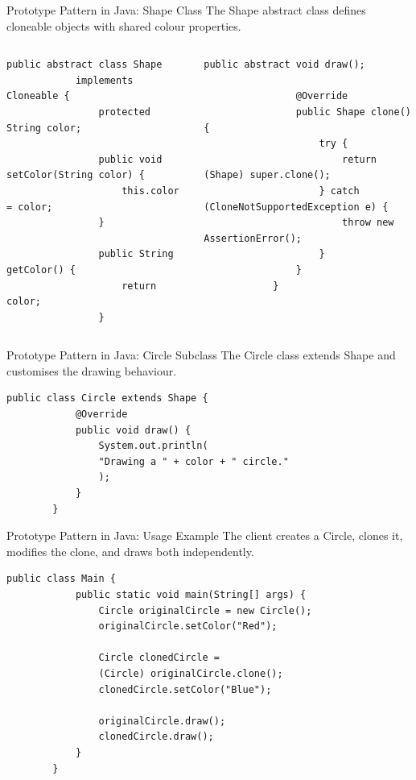 \documentclass[aspectratio=169, table]{beamer}
\begin{document}
\begin{frame}[fragile]{Prototype Pattern in Java: Shape Class}
	\vspace{20pt}
	The Shape abstract class defines cloneable objects with shared colour properties.
	
	\vspace{10pt}
	\begin{columns}[T]
		\begin{lstlisting}[style=JavaStyle]
			public abstract class Shape 
			implements Cloneable {
				protected String color;
				
				public void setColor(String color) {
					this.color = color;
				}
				
				public String getColor() {
					return color;
				}
			\end{lstlisting}
			
			\begin{lstlisting}[style=JavaStyle, firstnumber=12]
				public abstract void draw();
				
				@Override
				public Shape clone() {
					try {
						return (Shape) super.clone();
					} catch (CloneNotSupportedException e) {
						throw new AssertionError();
					}
				}
			}
		\end{lstlisting}
	\end{columns}
\end{frame}



\begin{frame}[fragile]{Prototype Pattern in Java: Circle Subclass}
	\vspace{20pt}
	The Circle class extends Shape and customises the drawing behaviour.
	
	\vspace{10pt}
	\begin{lstlisting}[style=JavaStyle]
		public class Circle extends Shape {
			@Override
			public void draw() {
				System.out.println(
				"Drawing a " + color + " circle."
				);
			}
		}
	\end{lstlisting}
\end{frame}

\begin{frame}[fragile]{Prototype Pattern in Java: Usage Example}
	\vspace{20pt}
	The client creates a Circle, clones it, modifies the clone, and draws both independently.
	
	\vspace{10pt}
	\begin{lstlisting}[style=JavaStyle]
		public class Main {
			public static void main(String[] args) {
				Circle originalCircle = new Circle();
				originalCircle.setColor("Red");
				
				Circle clonedCircle = 
				(Circle) originalCircle.clone();
				clonedCircle.setColor("Blue");
				
				originalCircle.draw();   
				clonedCircle.draw();     
			}
		}
	\end{lstlisting}
\end{frame}
\end{document}
